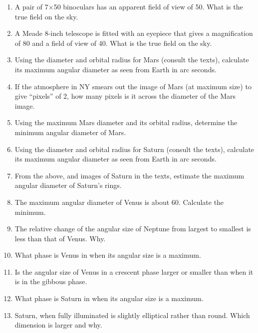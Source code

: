 \begin{enumerate} 

\item
A pair of 7$\times$50 binoculars has an apparent field of view of
50\deg. What is the true field on the sky.

\item
A Meade 8-inch telescope is fitted with an eyepiece that gives a magnification
of 80 and a field of view of 40\deg. What is the true field on the sky.

\item
Using the diameter and orbital radius for Mars (consult the texts),
calculate its maximum angular diameter as seen from Earth in arc
seconds.

\item
If the atmosphere in NY smears out the image of Mars (at maximum size)
to give
``pixels'' of 2\arcsec, how many pixels is it across the diameter of
the Mars image. 

\item
Using the maximum Mars diameter and its orbital radius,  determine the
minimum angular diameter of Mars.

\item
Using the diameter and orbital radius for Saturn (consult the texts),
calculate its maximum angular diameter as seen from Earth in arc seconds.

\item
From the above, and images of Saturn in the texts, estimate the maximum
angular diameter of Saturn's rings.

\item
The maximum angular diameter of Venus is about 60\arcsec. Calculate
the minimum.

\item
The relative change of the angular size of Neptune from largest to
smallest is less than that of Venus. Why.

\item
What phase is Venus in when its angular size is a maximum.

\item
Is the angular size of Venus in a crescent phase larger or smaller
than when it is in the gibbous phase. 

\item
What phase is Saturn in when its angular size is a maximum.

\item
Saturn, when fully illuminated is slightly elliptical rather than
round. Which dimension is larger and why.


\end{enumerate}
